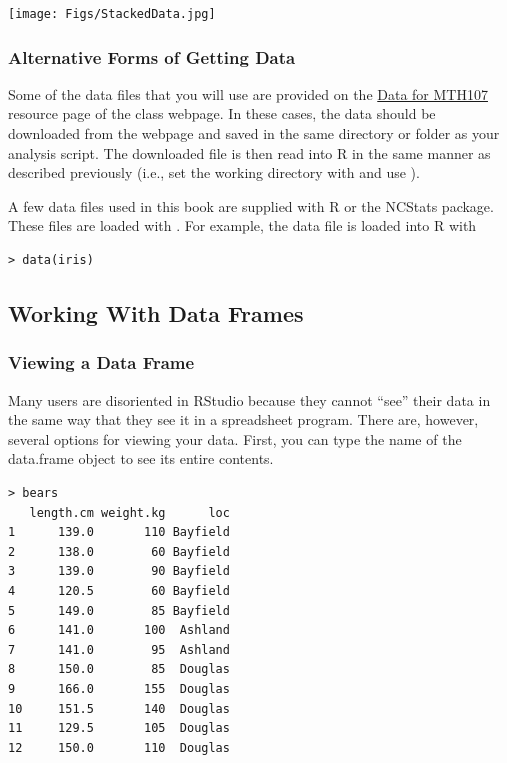 \documentclass[10pt,openany]{book}\usepackage[]{graphicx}\usepackage[]{color}
\makeatletter
\newenvironment{kframe}{%
 \def\at@end@of@kframe{}%
 \ifinner\ifhmode%
  \def\at@end@of@kframe{\end{minipage}}%
  \begin{minipage}{\columnwidth}%
 \fi\fi%
 \def\FrameCommand##1{\hskip\@totalleftmargin \hskip-\fboxsep
 \colorbox{shadecolor}{##1}\hskip-\fboxsep
     \hskip-\linewidth \hskip-\@totalleftmargin \hskip\columnwidth}%
 \MakeFramed {\advance\hsize-\width
   \@totalleftmargin\z@ \linewidth\hsize
   \@setminipage}}%
 {\par\unskip\endMakeFramed%
 \at@end@of@kframe}
\newenvironment{knitrout}{}{} %
\makeatother
\begin{document}
\begin{center}
  \texttt{[image: Figs/StackedData.jpg]}
\end{center}


\subsubsection*{Alternative Forms of Getting Data} \label{sect:RAltData}
Some of the data files that you will use are provided on the \href{http://derekogle.com/NCMTH107/resources/data_107}{Data for MTH107} resource page of the class webpage.  In these cases, the data should be downloaded from the webpage and saved in the same directory or folder as your analysis script.  The downloaded file is then read into R in the same manner as described previously (i.e., set the working directory with  and use ).

A few data files used in this book are supplied with R or the NCStats package.  These files are loaded with .  For example, the  data file is loaded into R with
\begin{knitrout}
\color{fgcolor}\begin{kframe}
\begin{verbatim}
> data(iris)
\end{verbatim}
\end{kframe}
\end{knitrout}


\subsection{Working With Data Frames}  \label{sect:RWorkdf}
\subsubsection{Viewing a Data Frame}  \label{sect:RViewdf}
Many users are disoriented in RStudio because they cannot ``see'' their data in the same way that they see it in a spreadsheet program.  There are, however, several options for viewing your data.  First, you can type the name of the data.frame object to see its entire contents.
\begin{knitrout}
\color{fgcolor}\begin{kframe}
\begin{verbatim}
> bears
   length.cm weight.kg      loc
1      139.0       110 Bayfield
2      138.0        60 Bayfield
3      139.0        90 Bayfield
4      120.5        60 Bayfield
5      149.0        85 Bayfield
6      141.0       100  Ashland
7      141.0        95  Ashland
8      150.0        85  Douglas
9      166.0       155  Douglas
10     151.5       140  Douglas
11     129.5       105  Douglas
12     150.0       110  Douglas
\end{verbatim}
\end{kframe}
\end{knitrout}
\end{document}
